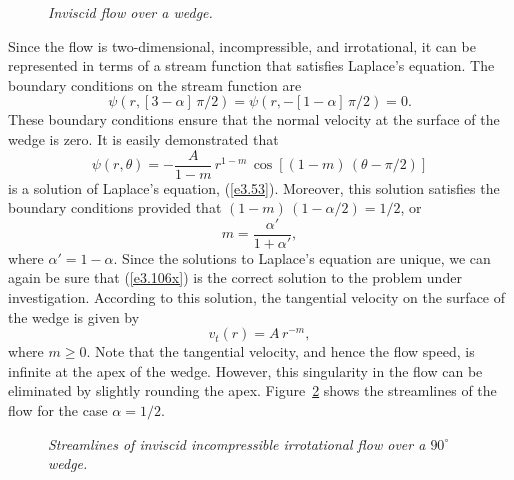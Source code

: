\begin{figure}
\epsfysize=3in
\centerline{}
\caption{\em Inviscid flow over a wedge.}\label{fwedge2}
\end{figure}

Since the flow is two-dimensional, incompressible, and irrotational, it can be represented in terms of a stream function that
satisfies Laplace's equation. The
boundary conditions on the stream function are
\begin{equation}
\psi\left(r,[3-\alpha]\,\pi/2\right) =\psi\left(r,-[1-\alpha]\,\pi/2\right)=0.
\end{equation}
These boundary conditions ensure that the normal velocity at the surface of the wedge is zero. 
It is easily demonstrated that
\begin{equation}\label{e3.106x}
\psi(r,\theta) = -\frac{A}{1-m}\,r^{1-m}\,\cos\left[(1-m)\,(\theta-\pi/2)\right]
\end{equation}
is a solution of Laplace's equation, (\ref{e3.53}). Moreover, this solution satisfies the boundary conditions provided that 
$(1-m)\,(1-\alpha/2) = 1/2$, or
\begin{equation}
m=\frac{\alpha'}{1+\alpha'},
\end{equation}
where $\alpha'=1-\alpha$. 
Since the solutions to Laplace's equation are
unique, we can again  be sure that (\ref{e3.106x}) is the correct 
solution to the problem under investigation. According to this solution, the tangential velocity on the surface of the
wedge is given by
\begin{equation}
v_t(r) = A\,r^{-m},
\end{equation}
where $m\geq 0$. 
Note that the tangential velocity, and hence the flow speed, is infinite at the apex of the wedge.  However, this
singularity in the flow can be eliminated by slightly rounding the apex.
Figure~\ref{fwedge3} shows the streamlines of the
flow for the case $\alpha=1/2$. 

\begin{figure}
\epsfysize=3in
\centerline{}
\caption{\em Streamlines of inviscid incompressible irrotational flow over a $90^\circ$ wedge.}\label{fwedge3}
\end{figure}

